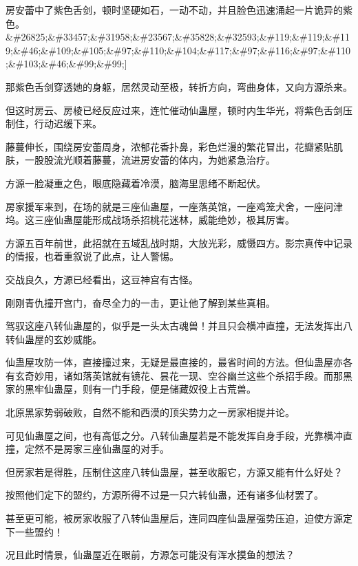 
\begin{this_body}

房安蕾中了紫色舌剑，顿时坚硬如石，一动不动，并且脸色迅速涌起一片诡异的紫色。\&\#26825;\&\#33457;\&\#31958;\&\#23567;\&\#35828;\&\#32593;\&\#119;\&\#119;\&\#119;\&\#46;\&\#109;\&\#105;\&\#97;\&\#110;\&\#104;\&\#117;\&\#97;\&\#116;\&\#97;\&\#110;\&\#103;\&\#46;\&\#99;\&\#99;]

那紫色舌剑穿透她的身躯，居然灵动至极，转折方向，弯曲身体，又向方源杀来。

但这时房云、房棱已经反应过来，连忙催动仙蛊屋，顿时内生华光，将紫色舌剑压制住，行动迟缓下来。

藤蔓伸长，围绕房安蕾周身，浓郁花香扑鼻，彩色烂漫的繁花冒出，花瓣紧贴肌肤，一股股流光顺着藤蔓，流进房安蕾的体内，为她紧急治疗。

方源一脸凝重之色，眼底隐藏着冷漠，脑海里思绪不断起伏。

房家援军来到，在场的就是三座仙蛊屋，一座落英馆，一座鸡笼犬舍，一座问津坞。这三座仙蛊屋能形成战场杀招桃花迷林，威能绝妙，极其厉害。

方源五百年前世，此招就在五域乱战时期，大放光彩，威慑四方。影宗真传中记录的情报，也着重叙说了此点，让人警惕。

交战良久，方源已经看出，这豆神宫有古怪。

刚刚青仇撞开宫门，奋尽全力的一击，更让他了解到某些真相。

驾驭这座八转仙蛊屋的，似乎是一头太古魂兽！并且只会横冲直撞，无法发挥出八转仙蛊屋的玄妙威能。

仙蛊屋攻防一体，直接撞过来，无疑是最直接的，最省时间的方法。但仙蛊屋亦各有玄奇妙用，诸如落英馆就有镜花、昙花一现、空谷幽兰这些个杀招手段。而那黑家的黑牢仙蛊屋，则有一门手段，便是储藏奴役上古荒兽。

北原黑家势弱破败，自然不能和西漠的顶尖势力之一房家相提并论。

可见仙蛊屋之间，也有高低之分。八转仙蛊屋若是不能发挥自身手段，光靠横冲直撞，定然不是房家三座仙蛊屋的对手。

但房家若是得胜，压制住这座八转仙蛊屋，甚至收服它，方源又能有什么好处？

按照他们定下的盟约，方源所得不过是一只六转仙蛊，还有诸多仙材罢了。

甚至更可能，被房家收服了八转仙蛊屋后，连同四座仙蛊屋强势压迫，迫使方源定下一些盟约！

况且此时情景，仙蛊屋近在眼前，方源怎可能没有浑水摸鱼的想法？


\end{this_body}
